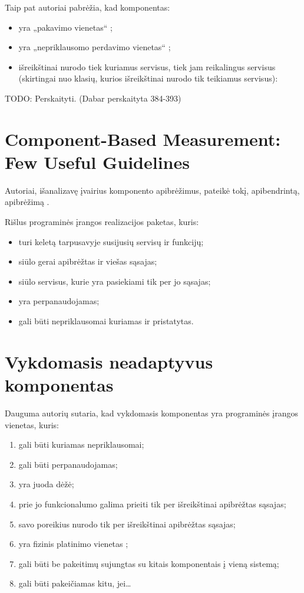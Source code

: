 Taip pat autoriai pabrėžia, kad komponentas:
\begin{itemize}
  \item yra „pakavimo vienetas“ %
    \cite[387]{objects-components-and-frameworks-with-uml};
  \item yra „nepriklausomo perdavimo vienetas“ \cite[387]{objects-components-and-frameworks-with-uml};
  \item išreikštinai nurodo tiek kuriamus servisus, tiek jam
    reikalingus servisus (skirtingai nuo klasių, kurios išreikštinai
    nurodo tik teikiamus servisus):
\end{itemize}

TODO: Perskaityti. (Dabar perskaityta 384-393)

\section{Component-Based Measurement: Few Useful Guidelines}

Autoriai, išanalizavę įvairius komponento apibrėžimus, pateikė tokį,
apibendrintą, apibrėžimą \cite[2]{Gill:2003:CMF:966221.966237}.
\begin{defn}[Komponentas]
  Rišlus programinės įrangos realizacijos paketas, kuris:
  \begin{itemize}
    \item turi keletą tarpusavyje susijusių servisų ir funkcijų;
    \item siūlo gerai apibrėžtas ir viešas sąsajas;
    \item siūlo servisus, kurie yra pasiekiami tik per jo sąsajas;
    \item yra perpanaudojamas;
    \item gali būti nepriklausomai kuriamas ir pristatytas.
  \end{itemize}
\end{defn}

\section{Vykdomasis neadaptyvus komponentas}

Dauguma autorių sutaria, kad vykdomasis komponentas yra programinės
įrangos vienetas, kuris:
\begin{enumerate}
  \item gali būti kuriamas nepriklausomai;
  \item gali būti perpanaudojamas;
  \item yra juoda dėžė;
  \item prie jo funkcionalumo galima prieiti tik per išreikštinai
    apibrėžtas sąsajas;
  \item savo poreikius nurodo tik per išreikštinai apibrėžtas sąsajas;
  \item yra fizinis platinimo vienetas ;
  \item gali būti be pakeitimų sujungtas su kitais komponentais į
    vieną sistemą;
  \item gali būti pakeičiamas kitu, jei…
\end{enumerate}


